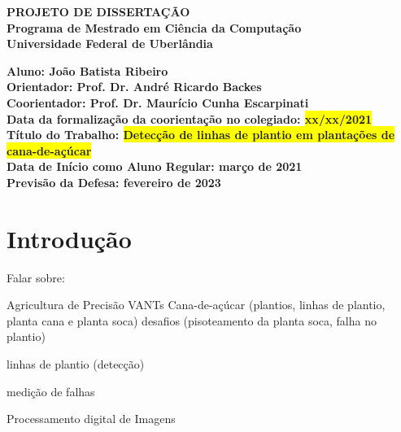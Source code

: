 \documentclass[12pt, a4paper, english, brazil]{article}
\newcommand{\ideia}[1]{\todo[author=\textbf{Ideia},color=green!30,caption={#1},inline]{#1}}
\newcommand{\duvida}[1]{\todo[author=\textbf{Dúvida},color=cyan!30,caption={#1},inline]{#1}}
\newcommand{\revisar}[1]{\todo[author=\textbf{Revisar},color=yellow!30,caption={#1},inline]{#1}}
\newcommand{\atencao}[1]{\todo[author=\textbf{Atenção},color=red!30,caption={#1},inline]{#1}}
\newcommand{\lineS}[1]{
    {{\color{black} 
        \noindent\makebox[\linewidth]{\rule{\paperwidth}{1pt}}
        }}
    {{\color{red} #1 }}

    {{\color{black}
        \noindent\makebox[\linewidth]{\rule{\paperwidth}{1pt}}
    }}
}
\newcommand{\textRed}[1]{{{\color{red} #1 }}}
\begin{document}
\rhead{\thepage}

\begin{center}
	\bf{\LARGE{PROJETO DE DISSERTAÇÃO}\\ $\ $\\}
	\Large{Programa de Mestrado em Ciência da Computação\\
		Universidade Federal de Uberlândia}\\ $\ $\\
\end{center}

\begin{center}
	\bf{Aluno: João Batista Ribeiro\\ $\ $\\
		Orientador: Prof. Dr. André Ricardo Backes\\ $\ $\\
		Coorientador: Prof. Dr. Maurício Cunha Escarpinati\\ $\ $\\
		Data da formalização da coorientação no colegiado: \colorbox{yellow}{xx/xx/2021}\\ $\ $\\
		Título do Trabalho: \colorbox{yellow}{Detecção de linhas de plantio em plantações de cana-de-açúcar}\\ $\ $\\
		Data de Início como Aluno Regular: março de 2021\\ $\ $\\
		Previsão da Defesa: fevereiro de 2023\\ $\ $\\}
\end{center}

\section{Introdução}





\textRed{
Falar sobre:

Agricultura de Precisão
    VANTs
Cana-de-açúcar (plantios, linhas de plantio, planta cana e planta soca)
desafios (pisoteamento da planta soca, falha no plantio)

linhas de plantio (detecção) 

medição de falhas

Processamento digital de Imagens
}
\end{document}
